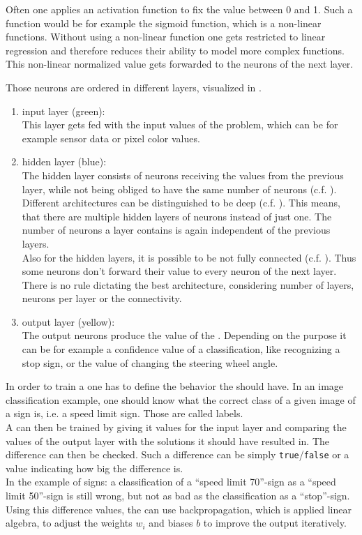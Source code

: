 Often one applies an activation function to fix the value between 0 and 1. Such a function would be for example the sigmoid function, which is a non-linear functions. Without using a non-linear function one gets restricted to linear regression and therefore reduces their ability to model more complex functions. \cite{glorot2010understanding}
This non-linear normalized value gets forwarded to the neurons of the next layer.

Those neurons are ordered in different layers, visualized in .
\begin{enumerate}
	\item input layer (green):\\ \label{item input layer}
	This layer gets fed with the input values of the problem, which can be for example sensor data or pixel color values.
	\item hidden layer (blue):\\\label{item hidden layer}
	The hidden layer consists of neurons receiving the values from the previous layer, while not being obliged to have the same number of neurons (c.f. ).
	Different architectures can be distinguished to be deep (c.f. ). This means, that there are multiple hidden layers of neurons instead of just one. The number of neurons a layer contains is again independent of the previous layers.\\
	Also for the hidden layers, it is possible to be not fully connected (c.f. ). Thus some neurons don't forward their value to every neuron of the next layer.\\
	There is no rule dictating the best architecture, considering number of layers, neurons per layer or the connectivity.
	\item output layer (yellow):\\ \label{item output layer}
	The output neurons produce the value of the \nn. Depending on the \nns purpose it can be for example a confidence value of a classification, like recognizing a stop sign, or the value of changing the steering wheel angle. 
\end{enumerate}

In order to train a \nn one has to define the behavior the \nn should have. In an image classification example, one should know what the correct class of a given image of a sign is, i.e. a speed limit sign. Those are called labels.\\
A \nn can then be trained by giving it values for the input layer and comparing the values of the output layer with the solutions it should have resulted in. The difference can then be checked. Such a difference can be simply \texttt{true}/\texttt{false} or a value indicating how big the difference is.\\
In the example of signs: a classification of a ``speed limit 70''-sign as a ``speed limit 50''-sign is still wrong, but not as bad as the classification as a ``stop''-sign.\\
Using this difference values, the \nn can use backpropagation, which is applied linear algebra, to adjust the weights $w_i$ and biases $b$ to improve the output iteratively.

